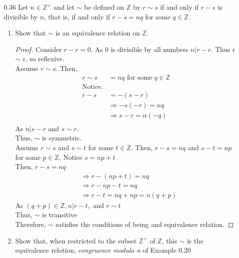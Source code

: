 \documentclass[12pt]{article}
\newcommand{\Z}{\mathds{Z}}
\DeclarePairedDelimiter\abs{\lvert}{\rvert}
\begin{document}
\begin{enumerate}
		$\abs{x-y} \leq 3$ is not an equivalence relation. 
		\begin{proof}
			Let $x=2,y=0,z=-2$, then $x\mathscr{R} y$ and $x\mathscr{R} y$ since $\abs{2-0}\geq 3$ and $\abs{0-(-2))\geq 3}$ But $x\mathscr{R}z$ is not true as $\abs{2-(-2)}=4\nleq3$\\
			Therefore, $x$ $\mathscr{R} $ $y$ is not an equivalence relation.
		\end{proof}
	\item[0.36] Let $n \in \Z^+$ and let $\sim$ be defined on $\Z$ by $r \sim s$ if and only if $r-s$ is divisible by $n$, that is, if and only if $r-s=nq$ for some $q \in \Z$.
	\begin{enumerate}
		\item Show that $\sim$ is an equivalence relation on $\Z$.
		\begin{proof}
			Consider $r-r=0$. As 0 is divisible by all numbers $ n | r-r.$ Thus r $\sim$ r, so reflexive.\\
			Assume $r \sim s$. Then, 
			$$
			\begin{aligned}
				r \sim s &= nq \text{ for some } q \in \Z\\
				\text{Notice.}\\
				r-s&=-(s-r) \\
				&\Rightarrow -s(-r)=nq\\
				&\Rightarrow s-r = n(-q)\\
			\end{aligned}
			$$
			As $n|s-r$ and $s\sim r$.\\
			Thus, $\sim$ is symmetric.\\
			Assume $r\sim s$ and $s \sim t$ for some $t \in \Z$. Then, $r-s=nq$ and $s-t=np$ for some $p\in \Z$. Notice $s=np+t$\\
			Then, $r-s = nq$
			$$\begin{aligned}
				&\Rightarrow r-(np+t)=nq \\
				&\Rightarrow r-np-t=nq \\
				&\Rightarrow r-t=nq+np=n(q+p)
			\end{aligned}$$
			As $(q+p) \in \Z, n|r-t,$ and $r\sim t$ \\
			Thus, $\sim$ is transitive \\
			Therefore, $\sim$ satisfies the conditions of being and equivalence relation.
		\end{proof}
		\item Show that, when restricted to the subset $\Z^+$ of $\Z$, this $\sim$ is the equivalence relation, \textit{congruence modulo n} of Example 0.20

\end{enumerate}
\end{enumerate}
\end{document}
